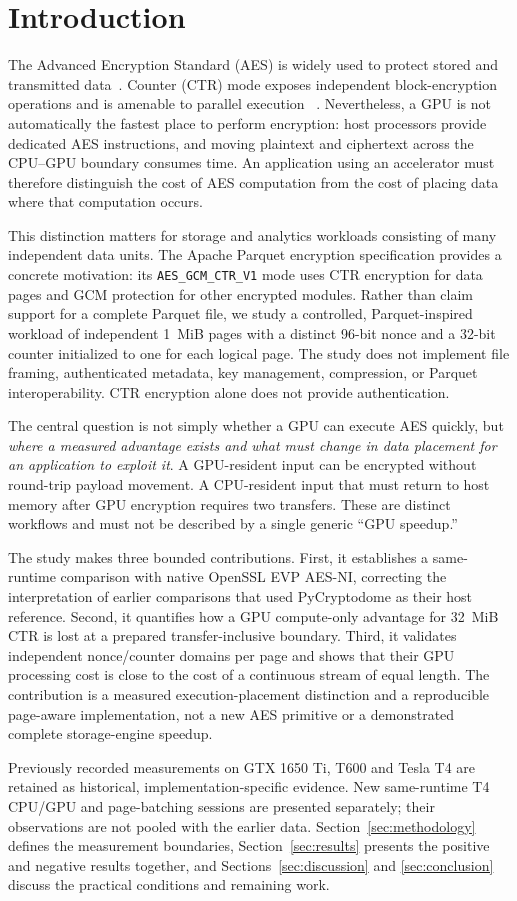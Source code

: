\section{Introduction}
The Advanced Encryption Standard (AES) is widely used to protect stored and
transmitted data~\cite{nist2023aes}. Counter (CTR) mode exposes independent
block-encryption operations and is amenable to parallel execution
~\cite{dworkin2001modes}. Nevertheless, a GPU is not automatically the fastest
place to perform encryption: host processors provide dedicated AES instructions,
and moving plaintext and ciphertext across the CPU--GPU boundary consumes time.
An application using an accelerator must therefore distinguish the cost of AES
computation from the cost of placing data where that computation occurs.

This distinction matters for storage and analytics workloads consisting of many
independent data units. The Apache Parquet encryption specification provides a
concrete motivation: its \texttt{AES\_GCM\_CTR\_V1} mode uses CTR encryption for
data pages and GCM protection for other encrypted modules. Rather than claim
support for a complete Parquet file, we study a controlled, Parquet-inspired
workload of independent 1~MiB pages with a distinct 96-bit nonce and a 32-bit
counter initialized to one for each logical page. The study does not implement
file framing, authenticated metadata, key management, compression, or Parquet
interoperability. CTR encryption alone does not provide authentication.

The central question is not simply whether a GPU can execute AES quickly, but
\emph{where a measured advantage exists and what must change in data placement
for an application to exploit it}. A GPU-resident input can be encrypted without
round-trip payload movement. A CPU-resident input that must return to host
memory after GPU encryption requires two transfers. These are distinct
workflows and must not be described by a single generic ``GPU speedup.''

The study makes three bounded contributions. First, it establishes a
same-runtime comparison with native OpenSSL EVP AES-NI, correcting the
interpretation of earlier comparisons that used PyCryptodome as their host
reference. Second, it quantifies how a GPU compute-only advantage for 32~MiB
CTR is lost at a prepared transfer-inclusive boundary. Third, it validates
independent nonce/counter domains per page and shows that their GPU processing
cost is close to the cost of a continuous stream of equal length. The
contribution is a measured execution-placement distinction and a reproducible
page-aware implementation, not a new AES primitive or a demonstrated complete
storage-engine speedup.

Previously recorded measurements on GTX 1650 Ti, T600 and Tesla T4 are retained
as historical, implementation-specific evidence. New same-runtime T4 CPU/GPU
and page-batching sessions are presented separately; their observations are
not pooled with the earlier data. Section~\ref{sec:methodology} defines the
measurement boundaries, Section~\ref{sec:results} presents the positive and
negative results together, and Sections~\ref{sec:discussion} and
\ref{sec:conclusion} discuss the practical conditions and remaining work.
